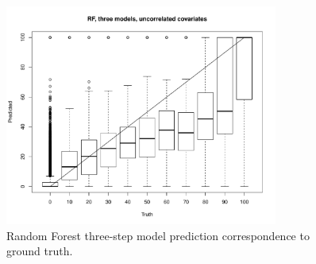 \documentclass[a4paper,10pt]{article}
\begin{document}
\begin{figure}
    \includegraphics[width=0.8\textwidth]{article-figures/boxplots/2019-03-19-rf-3m-uncor-box}
    \caption{Random Forest three-step model prediction correspondence to ground truth.}
    \label{box-rf-3m-uncor-hm}
\end{figure}
\end{document}
